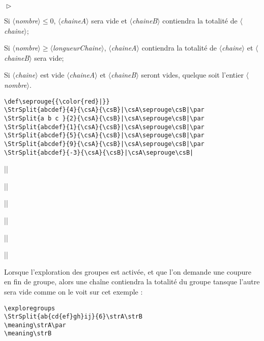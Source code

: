 \documentclass[a4paper,10pt]{article}
\newcommand\argu[1]{$\langle$\textit{#1}$\rangle$}
\newenvironment{Conditions}[1][1cm]%
{\begin{list}%
	{$\vartriangleright$}%
	{\setlength{\leftmargin}{#1}
	 \setlength{\itemsep}{0pt}
	 \setlength{\parsep}{0pt}
	 \setlength{\topsep}{2ptplus3ptminus2pt}
	}}%
{\end{list}}
\newcommand\styleexercice{\footnotesize}
\begin{document}
\begin{Conditions}
	\item Si \argu{nombre}${}\leqslant0$, \argu{chaineA} sera vide et \argu{chaineB} contiendra la totalité de \argu{chaine};
	\item Si \argu{nombre}${}\geqslant$\argu{longueurChaine}, \argu{chaineA} contiendra la totalité de \argu{chaine} et \argu{chaineB} sera vide;
	\item Si \argu{chaine} est vide \argu{chaineA} et \argu{chaineB} seront vides, quelque soit l'entier \argu{nombre}.
\end{Conditions}

\begin{minipage}[c]{0.65\linewidth}
\hfill
\begin{lstlisting}
\def\seprouge{{\color{red}|}}
\StrSplit{abcdef}{4}{\csA}{\csB}|\csA\seprouge\csB|\par
\StrSplit{a b c }{2}{\csA}{\csB}|\csA\seprouge\csB|\par
\StrSplit{abcdef}{1}{\csA}{\csB}|\csA\seprouge\csB|\par
\StrSplit{abcdef}{5}{\csA}{\csB}|\csA\seprouge\csB|\par
\StrSplit{abcdef}{9}{\csA}{\csB}|\csA\seprouge\csB|\par
\StrSplit{abcdef}{-3}{\csA}{\csB}|\csA\seprouge\csB|
\end{lstlisting}%
\end{minipage}\hfill
\begin{minipage}[c]{0.35\linewidth}
\styleexercice
\def\seprouge{{\color{red}|}}
|\csA\seprouge\csB|\par
{}|\csA\seprouge\csB|\par
{}|\csA\seprouge\csB|\par
{}|\csA\seprouge\csB|\par
{}|\csA\seprouge\csB|\par
{}|\csA\seprouge\csB|
\end{minipage}%

\setverbdelim{|}\medskip

Lorsque l'exploration des groupes est activée, et que l'on demande une coupure en fin de groupe, alors une chaîne contiendra la totalité du groupe tansque l'autre sera vide comme on le voit sur cet exemple :\par\nobreak\smallskip
\begin{minipage}[c]{0.65\linewidth}
\hfill
\begin{lstlisting}
\exploregroups
\StrSplit{ab{cd{ef}gh}ij}{6}\strA\strB
\meaning\strA\par
\meaning\strB
\end{lstlisting}%
\end{minipage}\hfill
\begin{minipage}[c]{0.35\linewidth}
	\styleexercice
	\exploregroups
	\strA\strB
	\meaning\strA\par
	\meaning\strB
\end{minipage}%
\medskip
\end{document}
